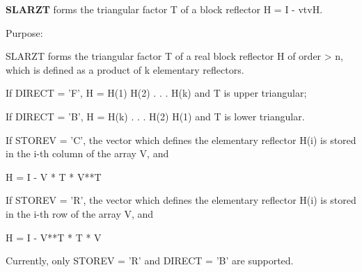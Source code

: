 {\bfseries S\+L\+A\+R\+Z\+T} forms the triangular factor T of a block reflector H = I -\/ vtv\+H. 

 \begin{DoxyParagraph}{Purpose\+: }
\begin{DoxyVerb} SLARZT forms the triangular factor T of a real block reflector
 H of order > n, which is defined as a product of k elementary
 reflectors.

 If DIRECT = 'F', H = H(1) H(2) . . . H(k) and T is upper triangular;

 If DIRECT = 'B', H = H(k) . . . H(2) H(1) and T is lower triangular.

 If STOREV = 'C', the vector which defines the elementary reflector
 H(i) is stored in the i-th column of the array V, and

    H  =  I - V * T * V**T

 If STOREV = 'R', the vector which defines the elementary reflector
 H(i) is stored in the i-th row of the array V, and

    H  =  I - V**T * T * V

 Currently, only STOREV = 'R' and DIRECT = 'B' are supported.\end{DoxyVerb}
 
\end{DoxyParagraph}

